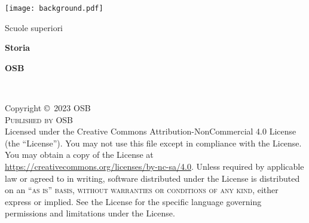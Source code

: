 \documentclass[
	11pt, %
	fleqn, %
	a4paper, %
]{LegrandOrangeBook}
\begin{document}

\titlepage %
	{\texttt{[image: background.pdf]}} %
	{ %
                \centering
		\vspace{16pt} %
		{\LARGE Scuole superiori\par} %
		\sffamily %
		{\Huge\bfseries Storia\par} %
		\vspace{24pt} %
		{\huge\bfseries OSB\par} %
	}


\thispagestyle{empty} %

~\vfill %

\noindent Copyright \copyright\ 2023 OSB\\ %

\noindent \textsc{Published by OSB}\\ %


\noindent Licensed under the Creative Commons Attribution-NonCommercial 4.0 License (the ``License''). You may not use this file except in compliance with the License. You may obtain a copy of the License at \url{https://creativecommons.org/licenses/by-nc-sa/4.0}. Unless required by applicable law or agreed to in writing, software distributed under the License is distributed on an \textsc{``as is'' basis, without warranties or conditions of any kind}, either express or implied. See the License for the specific language governing permissions and limitations under the License.\\ %
\end{document}
